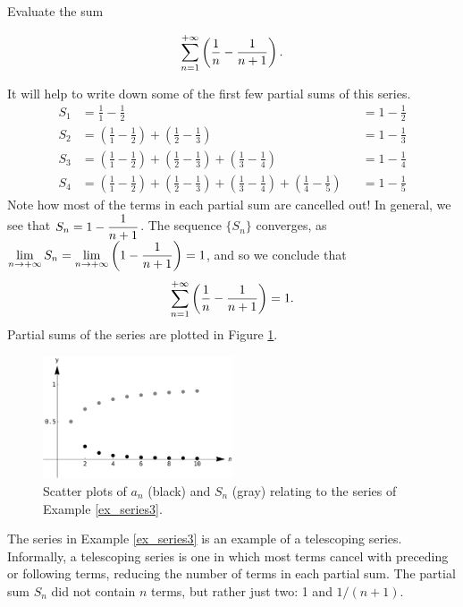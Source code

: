 \begin{example}\label{ex_series3}
Evaluate the sum

$$
\displaystyle \sum_{n=1}^{+\infty} \left(\frac1n-\frac1{n+1}\right).$$



It will help to write down some of the first few partial sums of this series.
\begin{align*}
S_1 &=	\frac11-\frac12 & & = 1-\frac12\\
S_2 &=	\left(\frac11-\frac12\right) + \left(\frac12-\frac13\right) & & = 1-\frac13\\
S_3 &=	\left(\frac11-\frac12\right) + \left(\frac12-\frac13\right)+\left(\frac13-\frac14\right) & &= 1-\frac14\\
S_4 &=	\left(\frac11-\frac12\right) + \left(\frac12-\frac13\right)+\left(\frac13-\frac14\right) +\left(\frac14-\frac15\right)& &= 1-\frac15
\end{align*}
Note how most of the terms in each partial sum are cancelled out! In general, we see that $\displaystyle S_n = 1-\frac{1}{n+1}$. The sequence $\{S_n\}$ converges,  as $\displaystyle \lim_{n\to+\infty}S_n = \lim_{n\to+\infty}\left(1-\frac1{n+1}\right) = 1$, and so we conclude that $$\displaystyle \sum_{n=1}^{+\infty} \left(\frac1n-\frac1{n+1}\right) = 1.$$ Partial sums of the series are plotted in Figure \ref{fig_series_7}.

\begin{figure}[H]
	\begin{center}
			\includegraphics[width=0.5\textwidth]{fig_series_7}
	\caption{Scatter plots of $a_n$ (black) and $S_n$ (gray) relating to the series of Example \ref{ex_series3}.}
	\label{fig_series_7}
	\end{center}
\end{figure}


\end{example}

The series in Example \ref{ex_series3} is an example of a telescoping series. Informally, a telescoping series is one in which most terms cancel with preceding or following terms, reducing the number of terms in each partial sum. The partial sum $S_n$ did not contain $n$ terms, but rather just two: 1 and $1/(n+1)$.

